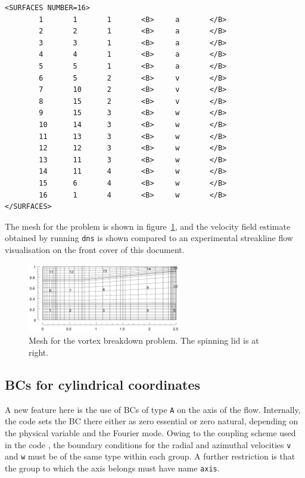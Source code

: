 \documentclass[11pt]{report}
\begin{document}
{\begin{verbatim}
<SURFACES NUMBER=16>
        1       1       1       <B>     a       </B>
        2       2       1       <B>     a       </B>
        3       3       1       <B>     a       </B>
        4       4       1       <B>     a       </B>
        5       5       1       <B>     a       </B>
        6       5       2       <B>     v       </B>
        7       10      2       <B>     v       </B>
        8       15      2       <B>     v       </B>
        9       15      3       <B>     w       </B>
        10      14      3       <B>     w       </B>
        11      13      3       <B>     w       </B>
        12      12      3       <B>     w       </B>
        13      11      3       <B>     w       </B>
        14      11      4       <B>     w       </B>
        15      6       4       <B>     w       </B>
        16      1       4       <B>     w       </B>
</SURFACES>
\end{verbatim}
}

The mesh for the problem is shown in figure~\ref{vb1msh}, and the
velocity field estimate obtained by running \verb|dns| is shown
compared to an experimental streakline flow visualisation on the front
cover of this document.
\begin{figure}
\begin{center}
\includegraphics[width=0.6\textwidth]{vb1mesh}
\end{center}
\caption{
\label{vb1msh}
  Mesh for the vortex breakdown problem.  The spinning lid is at right.
  }
\end{figure}

\subsection{BCs for cylindrical coordinates}
\label{sec.cbcs}

A new feature here is the use of BCs of type \verb+A+ on the axis of
the flow.  Internally, the code sets the BC there either as zero
essential or zero natural, depending on the physical variable and the
Fourier mode.  Owing to the coupling scheme used in the code
\citep{blsh04}, the boundary conditions for the radial and azimuthal
velocities \verb+v+ and \verb+w+ must be of the same type within each
group.  A further restriction is that the group to which the axis
belongs must have name \verb+axis+.
\end{document}
